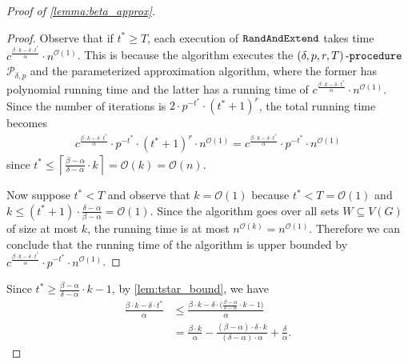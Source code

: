 \documentclass[letterpaper,11pt]{article}
\newenvironment{claimproof}{\begin{proof}\renewcommand{\qedsymbol}{$\lrcorner$}}{\end{proof}}
\newcommand{\1}[1]{\mathds{1}\left[#1\right]}
\newcommand{\randext}{\textnormal{\texttt{RandAndExtend}}}
\newcommand{\Oh}{\mathcal{O}}
\newcommand{\procext}[4]{\left( #1, #2, #3, #4 \right)\textnormal{-\texttt{procedure}}}
\newcommand{\procalg}[2]{\mathcal{P}_{#1,#2}}
\begin{document}
\begin{proof}[Proof of \cref{lemma:beta_approx}]
	\begin{claimproof}
		Observe that if $t^* \geq T$, each execution of $\randext$ takes time $c^{\frac{\beta \cdot k - \delta \cdot t^*}{\alpha}} \cdot n^{\Oh(1)}$.
		This is because the algorithm executes the $\procext{\delta}{p}{r}{T}$ $\procalg{\delta}{p}$ and the parameterized approximation algorithm, where the former has polynomial running time and the latter has a running time of $c^{\frac{\beta \cdot k - \delta \cdot t^*}{\alpha}} \cdot n^{\Oh(1)}$.
		Since the number of iterations is $2 \cdot p^{-t^*} \cdot (t^* + 1)^{r}$, the total running time becomes
		\begin{align*}
			c^{\frac{\beta \cdot k - \delta\cdot t^*}{\alpha}} \cdot p^{-t^*} \cdot (t^* + 1)^{r} \cdot n^{\Oh(1)} = c^{\frac{\beta \cdot k - \delta \cdot t^*}{\alpha}} \cdot p^{-t^*}  \cdot n^{\Oh(1)}
		\end{align*}
		since $t^* \leq \left\lceil  \frac{\beta - \alpha}{\delta - \alpha} \cdot k \right\rceil  = \Oh(k) = \Oh(n)$.

		Now suppose $t^* < T$ and observe that $k = \Oh(1)$ because $t^* < T = \Oh(1)$ and $k \leq \left( t^* + 1 \right)\cdot \frac{\delta - \alpha}{\beta - \alpha} = \Oh(1)$. Since the algorithm goes over all sets $W \subseteq V(G)$ of size at most $k$, the running time is at most $n^{\Oh(k)} = n^{\Oh(1)}$. Therefore we can conclude that the running time of the algorithm is upper bounded by $c^{\frac{\beta \cdot k - \delta \cdot t^*}{\alpha}} \cdot p^{-t^*}  \cdot n^{\Oh(1)}$.	
	\end{claimproof}

	Since $t^* \geq \frac{\beta - \alpha}{\delta - \alpha} \cdot k  - 1$, by \cref{lem:tstar_bound}, we have
	\begin{align}
		\frac{\beta \cdot k - \delta \cdot t^*}{\alpha} &\leq \frac{\beta \cdot k - \delta \cdot \biggl(\frac{\beta - \alpha}{\delta - \alpha} \cdot k - 1\biggr)}{\alpha} \nonumber \\ 
						   &= \frac{\beta \cdot k}{\alpha} - \frac{(\beta - \alpha) \cdot \delta \cdot k}{(\delta - \alpha) \cdot \alpha} + \frac{\delta}{\alpha}.\label{eq:bkdt_ub}
	\end{align}			


\end{proof}
\end{document}
